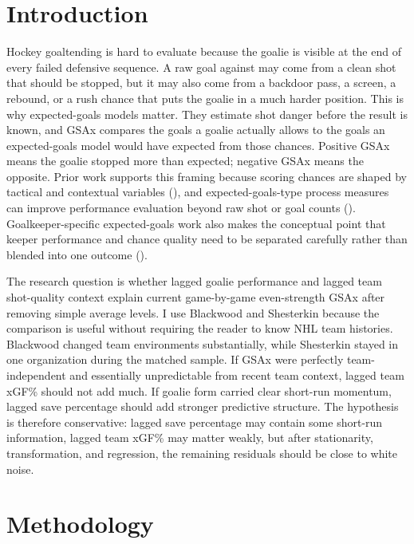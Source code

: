 \documentclass[
  10pt,
]{article}
\begin{document}
\section{Introduction}\label{introduction}

Hockey goaltending is hard to evaluate because the goalie is visible at the end of every failed defensive sequence. A raw goal against may come from a clean shot that should be stopped, but it may also come from a backdoor pass, a screen, a rebound, or a rush chance that puts the goalie in a much harder position. This is why expected-goals models matter. They estimate shot danger before the result is known, and GSAx compares the goals a goalie actually allows to the goals an expected-goals model would have expected from those chances. Positive GSAx means the goalie stopped more than expected; negative GSAx means the opposite. Prior work supports this framing because scoring chances are shaped by tactical and contextual variables (), and expected-goals-type process measures can improve performance evaluation beyond raw shot or goal counts (). Goalkeeper-specific expected-goals work also makes the conceptual point that keeper performance and chance quality need to be separated carefully rather than blended into one outcome ().

The research question is whether lagged goalie performance and lagged team shot-quality context explain current game-by-game even-strength GSAx after removing simple average levels. I use Blackwood and Shesterkin because the comparison is useful without requiring the reader to know NHL team histories. Blackwood changed team environments substantially, while Shesterkin stayed in one organization during the matched sample. If GSAx were perfectly team-independent and essentially unpredictable from recent team context, lagged team xGF\% should not add much. If goalie form carried clear short-run momentum, lagged save percentage should add stronger predictive structure. The hypothesis is therefore conservative: lagged save percentage may contain some short-run information, lagged team xGF\% may matter weakly, but after stationarity, transformation, and regression, the remaining residuals should be close to white noise.

\section{Methodology}\label{methodology}
\end{document}
